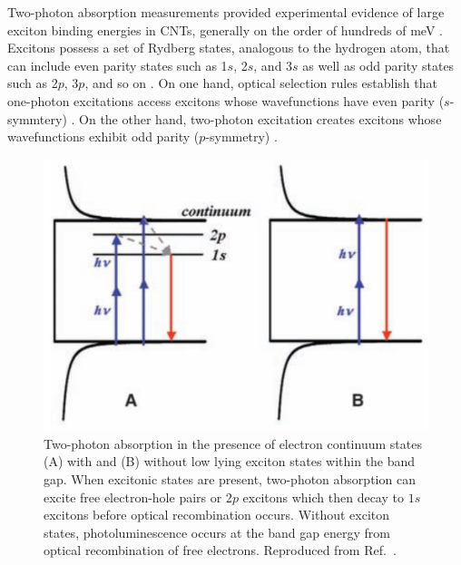 Two-photon absorption measurements provided experimental evidence of large exciton binding energies in CNTs, generally on the order of hundreds of meV \cite{maultzsch2005exciton, wang2005optical}. Excitons possess a set of Rydberg states, analogous to the hydrogen atom, that can include even parity states such as 1$s$, 2$s$, and 3$s$ as well as odd parity states such as 2$p$, 3$p$, and so on \cite{wang2005optical}. On one hand, optical selection rules establish that one-photon excitations access excitons whose wavefunctions have even parity ($s$-symmtery) \cite{wang2005optical}. On the other hand, two-photon excitation creates excitons whose wavefunctions exhibit odd parity ($p$-symmetry) \cite{wang2005optical}.

\begin{figure}[ht]
	\centering
	\includegraphics[scale=0.3]{images/chapter_optical_props/cnt_two_photon}
	\caption{ Two-photon absorption in the presence of electron continuum states (A) with and (B) without low lying exciton states within the band gap. When excitonic states are present, two-photon absorption can excite free electron-hole pairs or 2$p$ excitons which then decay to $1s$ excitons before optical recombination occurs. Without exciton states, photoluminescence occurs at the band gap energy from optical recombination of free electrons. Reproduced from Ref.\ \cite{wang2005optical}. }
	\label{fig:cnt_two_photon}
\end{figure}



